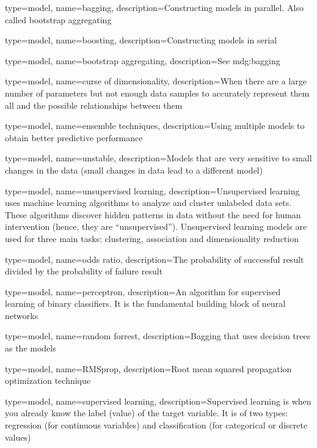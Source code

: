 

{
	type=model,
    name=bagging,
    description={Constructing models in parallel.  Also called bootstrap aggregating}
}

{
	type=model,
    name=boosting,
    description={Constructing models in serial}
}

{
	type=model,
    name=bootstrap aggregating,
    description={See \gls{mdg:bagging}}
}

{
	type=model,
    name=curse of dimensionality,
    description={When there are a large number of parameters but not enough data samples to accurately represent them all and the possible relationships between them}
}

{
	type=model,
    name=ensemble techniques,
    description={Using multiple models to obtain better predictive performance}
}

{
	type=model,
    name=unstable,
    description={Models that are very sensitive to small changes in the data (small changes in data lead to a different model)}
}

{
	type=model,
    name=unsupervised learning,
    description={Unsupervised learning uses machine learning algorithms to analyze and cluster unlabeled data sets. These algorithms discover hidden patterns in data without the need for human intervention (hence, they are ``unsupervised'').  Unsupervised learning models are used for three main tasks: clustering, association and dimensionality reduction}
}

{
	type=model,
    name=odds ratio,
    description={The probability of successful result divided by the probability of failure result}
}

{
	type=model,
    name=perceptron,
    description={An algorithm for supervised learning of binary classifiers.  It is the fundamental building block of neural networks}
}

{
	type=model,
    name=random forrest,
    description={Bagging that uses decision trees as the models}
}

{
	type=model,
    name=RMSprop,
    description={Root mean squared propagation optimization technique}
}

{
	type=model,
    name=supervised learning,
    description={Supervised learning is when you already know the label (value) of the target variable. It is of two types: regression (for continuous variables) and classification (for categorical or discrete values)}
} 